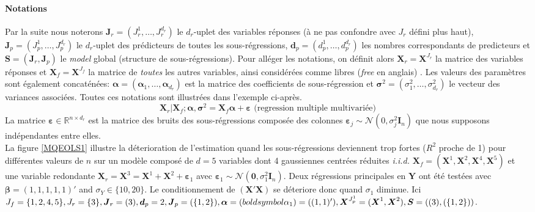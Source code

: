 \documentclass[12pt,a4paper]{report}
\begin{document}
\paragraph{Notations} Par la suite nous noterons $\boldsymbol{J}_r=(J_{r}^1,\ldots,J_r^{d_r})$ le $d_r$-uplet des variables réponses (à ne pas confondre avec $J_r$ défini plus haut), $\boldsymbol{J}_p=(J_{p}^1,\ldots,J_p^{d_r})$ le $d_r$-uplet des prédicteurs de toutes les sous-régressions, $\boldsymbol{d}_p=(d_p^1,\ldots,d_p^{d_{r}})$ les nombres correspondants de predicteurs et $\boldsymbol{S}=(\boldsymbol{J}_r,\boldsymbol{J}_p)$ le {\it model} global (structure de sous-régressions). Pour alléger les notations, on définit alors $\boldsymbol{X}_r=\boldsymbol{X}^{J_{r}}$ la matrice des variables réponses et $\boldsymbol{X}_f=\boldsymbol{X}^{J_{f}}$ la matrice de {\it toutes} les autres variables, ainsi considérées comme libres ({\it free} en anglais)
. Les valeurs des paramètres sont également concaténées: $\boldsymbol{\alpha}=(\boldsymbol{\alpha}_1,\ldots,\boldsymbol{\alpha}_{d_r})$ est la matrice des coefficients de sous-régression et $\boldsymbol{\sigma}^2=(\sigma^2_1,\ldots,\sigma^2_{d_r})$ le vecteur des variances associées.
Toutes ces notations sont illustrées dans l'exemple ci-après. 
	\begin{equation}
		\boldsymbol{X}_{r}|\boldsymbol{X}_f;\boldsymbol{\alpha},\boldsymbol{\sigma}^2=\boldsymbol{X}_{f}\boldsymbol{\alpha}+\boldsymbol{\varepsilon} \textrm{ \ \ \ (regression multiple multivariée)}
	\end{equation}
	La matrice $\boldsymbol{\varepsilon}\in \mathbb{R}^{n\times d_r}$ est la matrice des bruits des sous-régressions composée des colonnes \mbox{$\boldsymbol{\varepsilon}_j\sim \mathcal{N}(0,\sigma^2_j\boldsymbol{I}_n)$} que nous supposons indépendantes entre elles. \\
	
	La figure \ref{MQEOLS1} illustre la déterioration de l'estimation quand les sous-régressions deviennent trop fortes ($R^2$ proche de 1) pour différentes valeurs de $n$ sur un modèle composé de $d=5$ variables dont 4 gaussiennes centrées réduites {\it i.i.d. } $\boldsymbol{X}_f=(\boldsymbol{X}^1,\boldsymbol{X}^2,\boldsymbol{X}^4,\boldsymbol{X}^5)$ et une variable redondante $\boldsymbol{X}_r=\boldsymbol{X}^3=\boldsymbol{X}^1+\boldsymbol{X}^2+\boldsymbol{\varepsilon}_1$ avec $\boldsymbol{\varepsilon}_1\sim{\mathcal{N}(\boldsymbol{0},\sigma_1^2\boldsymbol{I}_n)}$. Deux régressions principales en $\boldsymbol{Y}$ ont été testées avec $\boldsymbol{\beta}=(1,1,1,1,1)'$ and $\sigma_Y \in \{10,20\}$. Le conditionnement de $(\boldsymbol{X}'\boldsymbol{X})$ se déteriore donc quand $\sigma_1$ diminue. Ici $J_f=\{1,2,4,5\},J_r=\{3\},\boldsymbol{J}_r=(3),\boldsymbol{d}_p=2,\boldsymbol{J}_p=(\{1,2\}),\boldsymbol{\alpha}=(\\boldsymbol{\alpha}_1)=((1,1)'),\boldsymbol{X} ^{J_p^1}=(\boldsymbol{X}^1,\boldsymbol{X}^2),\boldsymbol{S}=((3),(\{1,2\}))$.\\
\end{document}
